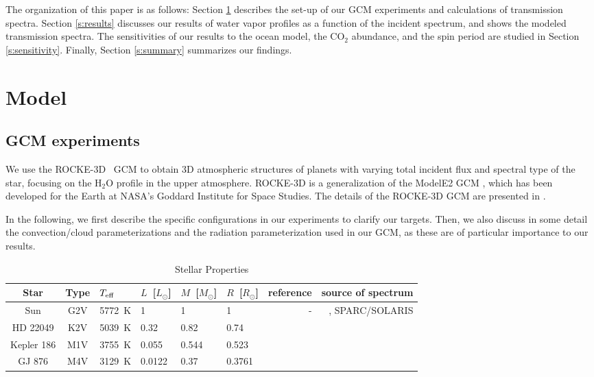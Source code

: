 \documentclass[11pt,numberedappendix,twocolappendix,]{emulateapj}
\def\water{H$_2$O}
\def\modelE{ROCKE-3D}
\def\wv{water vapor}
\begin{document}
The organization of this paper is as follows: %
Section \ref{s:model} describes the set-up of our GCM experiments and  calculations of transmission spectra. %
Section \ref{s:results} discusses our results of \wv{} profiles as a function of the incident spectrum, and shows the modeled transmission spectra. %
The sensitivities of our results to the ocean model, the CO$_2$ abundance, and the spin period are studied in Section \ref{s:sensitivity}. %
Finally, Section \ref{s:summary} summarizes our findings. %


\section{Model}
\label{s:model}

\subsection{GCM experiments}

We use the \modelE{} \ GCM \citep{Way2017} to obtain 3D atmospheric structures of planets with varying total incident flux and spectral type of the star, focusing on the \water{} profile in the upper atmosphere. 
\modelE{} is a generalization of the ModelE2 GCM \citep{Schmidt2014}, which has been developed for the Earth at NASA's Goddard Institute for Space Studies. 
The details of the ROCKE-3D GCM are presented in \citet{Way2017}.

In the following, we first describe the specific configurations in our experiments to clarify our targets. Then, we also discuss in some detail the convection/cloud parameterizations and the radiation parameterization used in our GCM, as these are of particular importance to our results. 



\begin{table}[!btp]
\caption{Stellar Properties}
\begin{center}
\begin{tabular}{ccllllrr} \hline \hline
%
Star & Type & $T_{\rm eff}$ & $L$~[$L_{\odot}$] & $M$~[$M_{\odot}$] & $R$~[$R_{\odot}$] & reference & source of spectrum \\ \hline
%
Sun & G2V & 5772~K & 1 & 1 & 1 & - & \citet{Lean2005}, SPARC/SOLARIS\footnotemark[1] \\ 
%
HD 22049 & K2V & 5039~K & 0.32 & 0.82 & 0.74 & \citet{Baines2012} & \citet{Segura2003} \\
%
Kepler 186 & M1V & 3755~K & 0.055 & 0.544 & 0.523 & \citet{Torres2015} & \citet{Allard2012} \\
%
GJ 876 & M4V & 3129~K & 0.0122 & 0.37 & 0.3761 & \citet{vonBraun2014} & \citet{Domagal-Goldman2014} \\ \hline
\end{tabular}
\end{center}
\label{tbl:stellar_properties}
\end{table}%
\end{document}
